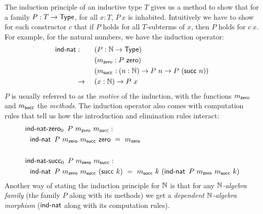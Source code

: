 \documentclass[a4paper,10pt]{report}
\begin{document}
The induction principle of an inductive type $T$ gives us a method to
show that for a family $P : T \to \mathsf{Type}$, for all $x : T$, $P\ x$ is
inhabited. Intuitively we have to show for each constructor $c$ that
if $P$ holds for all $T$-subterms of $x$, then $P$ holds for $c\
x$.
For example, for the natural numbers, we have the induction operator:
%
\begin{alignat*}{2}
  \indnat &:   &&\ (P : \Nat \to \Type) \\
          &    &&\ (m_{\zero} : P\ \zero) \\
          &    &&\ (m_{\suc} : (n : \Nat) \to P\ n \to P\ (\suc\ n)) \\
          &\to &&\ (x : \Nat) \to P\ x
\end{alignat*}
%
$P$ is usually referred to as the \emph{motive} of the induction, with
the functions $m_{\mathsf{zero}}$ and $m_{\mathsf{succ}}$ the \emph{methods}. The
induction operator also comes with computation rules that tell us how
the introduction and elimination rules interact:
%
\begin{align*}
  &\indnatzero_0\ P\ m_{\zero}\ m_{\suc} : \\
  &\ \ \indnat\ P\ m_{\zero}\ m_{\suc}\ \zero\ =\ m_{\zero} \\
  \\
  &\indnatsucc_0\ P\ m_{\zero}\ m_{\suc}  : \\
  &\ \ \indnat\ P\ m_{\zero}\ m_{\suc}\ (\suc\ k)\ =\ m_{\suc}\ k\ (\indnat\ P\ m_{\zero}\ m_{\suc}\ k)
\end{align*}
%
Another way of stating the induction principle for $\mathbb{N}$ is that for
any \emph{$\mathbb{N}$-algebra family} (the family $P$ along with its
methods) we get a \emph{dependent $\mathbb{N}$-algebra morphism} ($\operatorname{\mathsf{ind-nat}}$
along with its computation rules).
\end{document}

